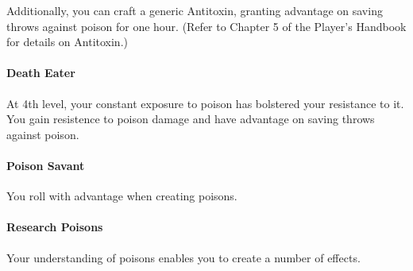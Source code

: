 Additionally, you can craft a generic Antitoxin, granting advantage on saving throws against poison for one hour.  (Refer to Chapter 5 of the Player's Handbook for details on Antitoxin.)

\paragraph*{Death Eater}
At 4th level, your constant exposure to poison has bolstered your resistance to it.
You gain resistence to poison damage and have advantage on saving throws against poison.

\paragraph*{Poison Savant}
You roll with advantage when creating poisons.










\paragraph*{Research Poisons}
Your understanding of poisons enables you to create a number of effects.

